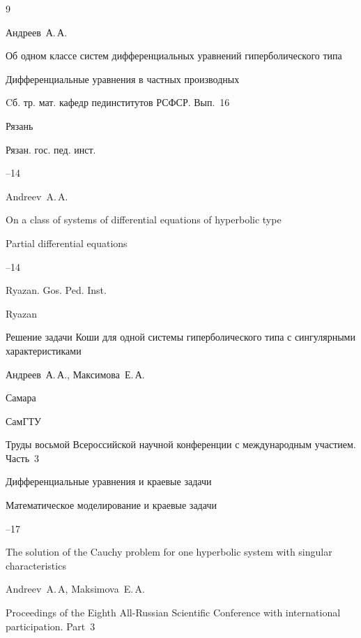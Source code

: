 \begin{thebibliography}{9}




\by Андреев~А.\,А.

\paper Об одном классе систем дифференциальных уравнений гиперболического типа 

\inbook Дифференциальные уравнения в частных производных

\bookinfo Cб. тр. мат. кафедр пединститутов РСФСР. Вып.~16


\publaddr Рязань

\publ Рязан. гос. пед. инст.

–14


\misctransl 

\by Andreev~A.\,A. 

\paper On a class of systems of differential equations of hyperbolic type

\inbook Partial differential equations

–14

\publ Ryazan. Gos. Ped. Inst. 

\publaddr Ryazan







\paper Решение задачи Коши для одной системы гиперболического типа с сингулярными характеристиками

\by Андреев~А.\,А., Максимова~Е.\,А.

\publaddr Самара

\publ СамГТУ

\inbook Труды восьмой Всероссийской научной конференции с международным участием. \rm Часть~3 

\bookinfo Дифференциальные уравнения и краевые задачи

\serial Математическое моделирование и краевые задачи


--17

\misctransl

\paper The solution of the Cauchy problem for one hyperbolic system with singular characteristics

\by Andreev~A.\,A, Maksimova~E.\,A.

\inbook Proceedings of the Eighth All-Russian Scientific Conference with international participation. \rm  Part~3


\end{thebibliography}

